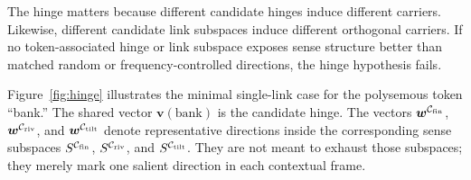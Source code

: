 \documentclass[
  aps,
  reprint,
  superscriptaddress,
  floatfix,
  nofootinbib,
  longbibliography
]{revtex4-2}
\begin{document}
The hinge matters because different candidate hinges induce different
carriers. Likewise, different candidate link subspaces induce different
orthogonal carriers. If no token-associated hinge or link subspace
exposes sense structure better than matched random or
frequency-controlled directions, the hinge hypothesis fails.

Figure~\ref{fig:hinge} illustrates the minimal single-link case for the
polysemous token ``bank.'' The shared vector
$\bm v(\text{bank})$ is the candidate hinge. The vectors
$\bm w^{\mathcal C_{\rm fin}}$,
$\bm w^{\mathcal C_{\rm riv}}$, and
$\bm w^{\mathcal C_{\rm tilt}}$ denote representative directions inside
the corresponding sense subspaces
$S^{\mathcal C_{\rm fin}}$,
$S^{\mathcal C_{\rm riv}}$, and
$S^{\mathcal C_{\rm tilt}}$. They are not meant to exhaust those
subspaces; they merely mark one salient direction in each contextual
frame.
\end{document}
